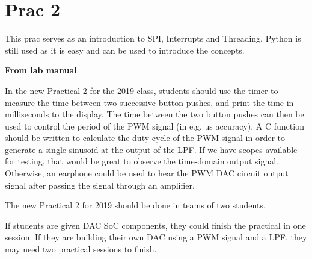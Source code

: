 \section{Prac 2}
This prac serves as an introduction to SPI, Interrupts and Threading. Python is still used as it is easy and can be used to introduce the concepts. 

\textbf{From lab manual}

In the new Practical 2 for the 2019 class, students should use the timer to measure the time between two successive button pushes, and print the time in milliseconds to the display. The time between the two button pushes can then be used to control the period of the PWM signal (in e.g. us accuracy). A C function should be written to calculate the duty cycle of the PWM signal in order to generate a single sinusoid at the output of the LPF. If we have scopes available for testing, that would be great to observe the time-domain output signal. Otherwise, an earphone could be used to hear the PWM DAC circuit output signal after passing the signal through an amplifier.

The new Practical 2 for 2019 should be done in teams of two students.

If students are given DAC SoC components, they could finish the practical in one session. If they are building their own DAC using a PWM signal and a LPF, they may need two practical sessions to finish.